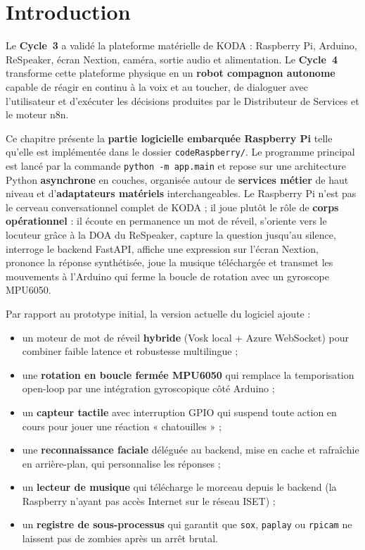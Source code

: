\documentclass[a4paper,12pt]{report}
\begin{document}
	\section{Introduction}
	
	Le \textbf{Cycle~3} a validé la plateforme matérielle de KODA : Raspberry Pi,
	Arduino, ReSpeaker, écran Nextion, caméra, sortie audio et alimentation. Le
	\textbf{Cycle~4} transforme cette plateforme physique en un \textbf{robot
	compagnon autonome} capable de réagir en continu à la voix et au toucher, de
	dialoguer avec l'utilisateur et d'exécuter les décisions produites par le
	Distributeur de Services et le moteur n8n.
	
	Ce chapitre présente la \textbf{partie logicielle embarquée Raspberry Pi}
	telle qu'elle est implémentée dans le dossier \texttt{codeRaspberry/}. Le
	programme principal est lancé par la commande \texttt{python -m app.main} et
	repose sur une architecture Python \textbf{asynchrone} en couches, organisée
	autour de \textbf{services métier} de haut niveau et d'\textbf{adaptateurs
	matériels} interchangeables. Le Raspberry Pi n'est pas le cerveau
	conversationnel complet de KODA ; il joue plutôt le rôle de \textbf{corps
	opérationnel} : il écoute en permanence un mot de réveil, s'oriente vers le
	locuteur grâce à la DOA du ReSpeaker, capture la question jusqu'au silence,
	interroge le backend FastAPI, affiche une expression sur l'écran Nextion,
	prononce la réponse synthétisée, joue la musique téléchargée et transmet les
	mouvements à l'Arduino qui ferme la boucle de rotation avec un gyroscope
	MPU6050.
	
	Par rapport au prototype initial, la version actuelle du logiciel ajoute :
	\begin{itemize}[noitemsep]
		\item un moteur de mot de réveil \textbf{hybride} (Vosk local + Azure
		WebSocket) pour combiner faible latence et robustesse multilingue ;
		\item une \textbf{rotation en boucle fermée MPU6050} qui remplace la
		temporisation open-loop par une intégration gyroscopique côté Arduino ;
		\item un \textbf{capteur tactile} avec interruption GPIO qui suspend toute
		action en cours pour jouer une réaction « chatouilles » ;
		\item une \textbf{reconnaissance faciale} déléguée au backend, mise en
		cache et rafraîchie en arrière-plan, qui personnalise les réponses ;
		\item un \textbf{lecteur de musique} qui télécharge le morceau depuis le
		backend (la Raspberry n'ayant pas accès Internet sur le réseau ISET) ;
		\item un \textbf{registre de sous-processus} qui garantit que \texttt{sox},
		\texttt{paplay} ou \texttt{rpicam} ne laissent pas de zombies après un
		arrêt brutal.
	\end{itemize}
	
\end{document}
